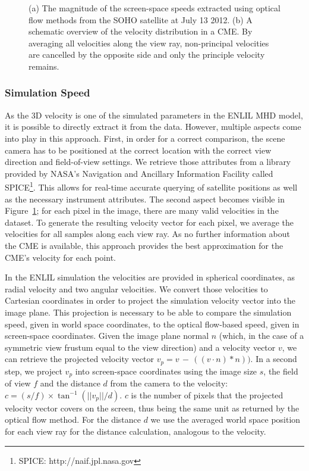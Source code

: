 \documentclass[journal]{vgtc}                %
\begin{document}
\begin{figure}
{  \label{fig:simulationvelocitygathering}
}
\caption{(a) The magnitude of the screen-space speeds extracted using optical flow methods from the SOHO satellite at July 13 2012. (b) A schematic overview of the velocity distribution in a CME. By averaging all velocities along the view ray, non-principal velocities are cancelled by the opposite side and only the principle velocity remains.}
\end{figure}

\subsubsection{Simulation Speed} \label{sec:simulationvelocity}
As the 3D velocity is one of the simulated parameters in the ENLIL MHD model, it is possible to directly extract it from the data. However, multiple aspects come into play in this approach. First, in order for a correct comparison, the scene camera has to be positioned at the correct location with the correct view direction and field-of-view settings. We retrieve those attributes from a library provided by NASA's Navigation and Ancillary Information Facility called SPICE\footnote{SPICE: http://naif.jpl.nasa.gov}. This allows for real-time accurate querying of satellite positions as well as the necessary instrument attributes. The second aspect becomes visible in Figure~\ref{fig:simulationvelocitygathering}; for each pixel in the image, there are many valid velocities in the dataset. To generate the resulting velocity vector for each pixel, we average the velocities for all samples along each view ray. As no further information about the CME is available, this approach provides the best approximation for the CME's velocity for each point.

In the ENLIL simulation the velocities are provided in spherical coordinates, as radial velocity and two angular velocities. We convert those velocities to Cartesian coordinates in order to project the simulation velocity vector into the image plane. This projection is necessary to be able to compare the simulation speed, given in world space coordinates, to the optical flow-based speed, given in screen-space coordinates. Given the image plane normal $n$ (which, in the case of a symmetric view frustum equal to the view direction) and a velocity vector $v$, we can retrieve the projected velocity vector $v_p = v\,-\,\left(\left(v \cdot n \right) * n \right))$. In a second step, we project $v_p$ into screen-space coordinates using the image size $s$, the field of view $f$ and the distance $d$ from the camera to the velocity: $ c = \left(s / f \right) \times \tan^{-1}\left( ||v_p|| / d \right)$. $c$ is the number of pixels that the projected velocity vector covers on the screen, thus being the same unit as returned by the optical flow method. For the distance $d$ we use the averaged world space position for each view ray for the distance calculation, analogous to the velocity. 
\end{document}
